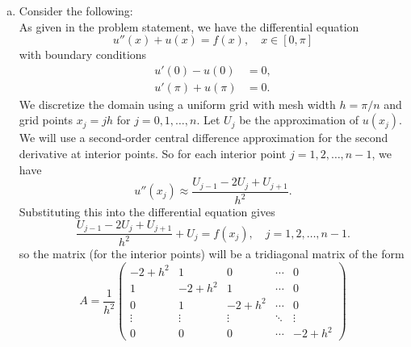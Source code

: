 \documentclass{article}
\begin{document}
\begin{enumerate}[(a)]
  \item Consider the following: \\
  As given in the problem statement, we have the differential equation
  \begin{equation*}
    u''(x) + u(x) = f(x), \quad x \in [0,\pi]
  \end{equation*}
  with boundary conditions
  \begin{align*}
    u'(0) - u(0) & = 0, \\
    u'(\pi) + u(\pi) & = 0.
  \end{align*}
  We discretize the domain using a uniform grid with mesh width $h = \pi/n$ and grid points $x_j = jh$ for $j = 0, 1, \ldots, n$. Let $U_j$ be the approximation of $u(x_j)$. We will use a second-order central difference approximation for the second derivative at interior points. So for each interior point $j = 1, 2, \ldots, n-1$, we have
  \begin{equation*}
    u''(x_j) \approx \frac{U_{j-1} - 2U_j + U_{j+1}}{h^2}.
  \end{equation*}
  Substituting this into the differential equation gives
  \begin{equation*}
    \frac{U_{j-1} - 2U_j + U_{j+1}}{h^2} + U_j = f(x_j), \quad j = 1, 2, \ldots, n-1.
  \end{equation*}
  so the matrix (for the interior points) will be a tridiagonal matrix of the form
  \begin{equation*}
    A = \frac{1}{h^2}\begin{pmatrix}
      -2 + h^2 & 1        & 0        & \cdots & 0        \\
      1        & -2 + h^2 & 1        & \cdots & 0        \\
      0        & 1        & -2 + h^2 & \cdots & 0        \\
      \vdots   & \vdots   & \vdots   & \ddots & \vdots   \\
      0        & 0        & 0        & \cdots & -2 + h^2

\end{pmatrix}
\end{equation*}
\end{enumerate}
\end{document}
